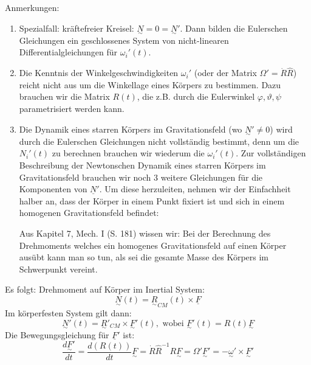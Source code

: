 \documentclass[10pt, letterpaper]{article}
\begin{document}
\noindent
Anmerkungen:


\begin{enumerate}
\item Spezialfall: kräftefreier Kreisel: $\underset{\sim}{N}=0=\underset{\sim}{N}'$. 
Dann bilden die Eulerschen Gleichungen ein geschlossenes System von nicht-linearen Differentialgleichungen für $\omega_i'(t)$.

\item Die Kenntnis der Winkelgeschwindigkeiten $\omega_i'$ (oder der Matrix $\Omega'=\dot{R}\hat{R}$) reicht nicht aus um die Winkellage eines Körpers zu bestimmen. Dazu brauchen wir die Matrix $R(t)$, die z.B. durch die Eulerwinkel $\varphi,\vartheta,\psi$ parametrisiert werden kann.

\item Die Dynamik eines starren Körpers im Gravitationsfeld (wo $\underset{\sim}{N}'\neq 0$) wird durch die Eulerschen Gleichungen nicht vollständig bestimmt, denn um die $N_i'(t)$ zu berechnen brauchen wir wiederum die $\omega_i'(t)$. Zur vollständigen Beschreibung der Newtonschen Dynamik eines starren Körpers im Gravitationsfeld brauchen wir noch 3 weitere Gleichungen für die Komponenten von $\underline{N}'$. Um diese herzuleiten, nehmen wir der Einfachheit halber an, dass der Körper in einem Punkt fixiert ist und sich in einem homogenen Gravitationsfeld befindet:
\begin{figure}[h]
\centering
{}
\end{figure}
Aus Kapitel 7, Mech. I (S. 181) wissen wir:
Bei der Berechnung des Drehmoments welches ein homogenes Gravitationsfeld auf einen Körper ausübt kann man so tun, als sei die gesamte Masse des Körpers im Schwerpunkt vereint.

\end{enumerate}


Es folgt: Drehmoment auf Körper im Inertial System:
\[\underset{\sim}{N}(t) = \underset{\sim}{R}_{CM}(t) \times \underline{F}\]
Im körperfesten System gilt dann:
\[\underset{\sim}{N}'(t) = \underset{\sim}{R}'_{CM} \times \underset{\sim}{F}'(t), \text{ wobei } \underset{\sim}{F}'(t) = R(t)\underset{\sim}{F}\]
Die Bewegungsgleichung für $\underline{F}'$ ist:
\[\frac{d\underset{\sim}{F}'}{dt} = \frac{d(R(t))}{dt}\underset{\sim}{F} = \dot{R}\hat{R}^{-1}R\underset{\sim}{F} = \Omega'\underset{\sim}{F}' = -\underset{\sim}{\omega}' \times \underset{\sim}{F}'\]
\end{document}
